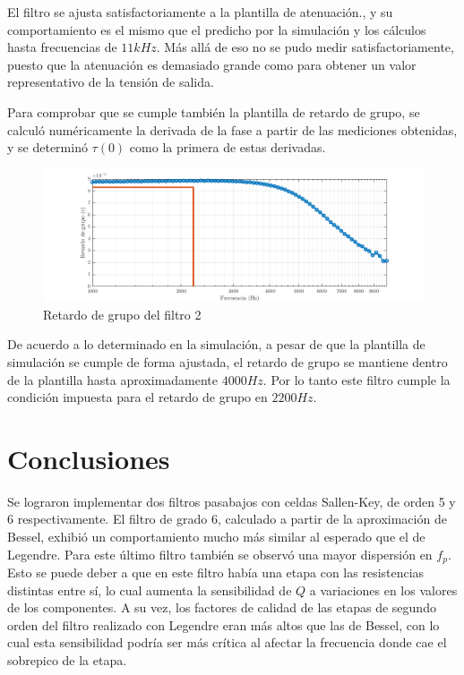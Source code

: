 \documentclass[../../tc_tp5_main.tex]{subfiles}
\begin{document}
El filtro se ajusta satisfactoriamente a la plantilla de atenuaci\'on., y su comportamiento es el mismo que el predicho por la simulaci\'on y los c\'alculos hasta frecuencias de $11kHz$. M\'as all\'a de eso no se pudo medir satisfactoriamente, puesto que la atenuaci\'on es demasiado grande como para obtener un valor representativo de la tensi\'on de salida. \par

Para comprobar que se cumple tambi\'en la plantilla de retardo de grupo, se calcul\'o num\'ericamente la derivada de la fase a partir de las mediciones obtenidas, y se determin\'o $\tau(0)$ como la primera de estas derivadas. 

\begin{figure}[H]
	\centering
	\includegraphics[scale=0.7]{imagenes/tc_tp5_ej1_gd.png}
	\caption{Retardo de grupo del filtro 2}
\end{figure}

De acuerdo a lo determinado en la simulaci\'on, a pesar de que la plantilla de simulaci\'on se cumple de forma ajustada, el retardo de grupo se mantiene dentro de la plantilla hasta aproximadamente $4000Hz$. Por lo tanto este filtro cumple la condici\'on impuesta para el retardo de grupo en $2200Hz$.

\section{Conclusiones}

Se lograron implementar dos filtros pasabajos con celdas Sallen-Key, de orden 5 y 6 respectivamente. El filtro de grado 6, calculado a partir de la aproximaci\'on de Bessel, exhibi\'o un comportamiento mucho m\'as similar al esperado que el de Legendre. Para este \'ultimo filtro tambi\'en se observ\'o una mayor dispersi\'on en $f_p$. Esto se puede deber a que en este filtro hab\'ia una etapa con las resistencias distintas entre s\'i, lo cual aumenta la sensibilidad de $Q$ a variaciones en los valores de los componentes. A su vez, los factores de calidad de las etapas de segundo orden del filtro realizado con Legendre eran m\'as altos que las de Bessel, con lo cual esta sensibilidad podr\'ia ser m\'as cr\'itica al afectar la frecuencia donde cae el sobrepico de la etapa. \par
\end{document}
